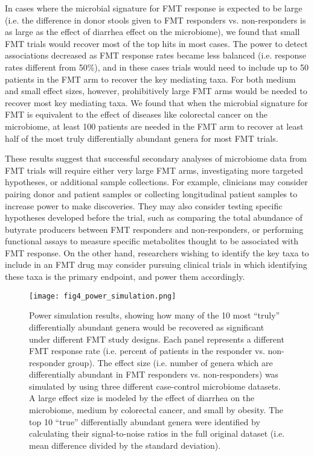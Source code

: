 In cases where the microbial signature for FMT response is expected to be large (i.e. the difference in donor stools given to FMT responders vs. non-responders is as large as the effect of diarrhea effect on the microbiome), we found that small FMT trials would recover most of the top hits in most cases.
The power to detect associations decreased as FMT response rates became less balanced (i.e. response rates different from 50\%), and in these cases trials would need to include up to 50 patients in the FMT arm to recover the key mediating taxa.
For both medium and small effect sizes, however, prohibitively large FMT arms would be needed to recover most key mediating taxa.
We found that when the microbial signature for FMT is equivalent to the effect of diseases like colorectal cancer on the microbiome, at least 100 patients are needed in the FMT arm to recover at least half of the most truly differentially abundant genera for most FMT trials.

These results suggest that successful secondary analyses of microbiome data from FMT trials will require either very large FMT arms, investigating more targeted hypotheses, or additional sample collections.
For example, clinicians may consider pairing donor and patient samples or collecting longitudinal patient samples to increase power to make discoveries.
They may also consider testing specific hypotheses developed before the trial, such as comparing the total abundance of butyrate producers between FMT responders and non-responders, or performing functional assays to measure specific metabolites thought to be associated with FMT response.
On the other hand, researchers wishing to identify the key taxa to include in an FMT drug may consider pursuing clinical trials in which identifying these taxa is the primary endpoint, and power them accordingly.


\begin{figure}
    \begin{center}
    \texttt{[image: fig4\_power\_simulation.png]}
    \caption{Power simulation results, showing how many of the 10 most ``truly'' differentially abundant genera would be recovered as significant under different FMT study designs. Each panel represents a different FMT response rate (i.e. percent of patients in the responder vs. non-responder group). The effect size (i.e. number of genera which are differentially abundant in FMT responders vs. non-responders) was simulated by using three different case-control microbiome datasets. A large effect size is modeled by the effect of diarrhea on the microbiome, medium by colorectal cancer, and small by obesity. The top 10 ``true'' differentially abundant genera were identified by calculating their signal-to-noise ratios in the full original dataset (i.e. mean difference divided by the standard deviation).}\label{fig:power-sim}
    \end{center}
\end{figure}

